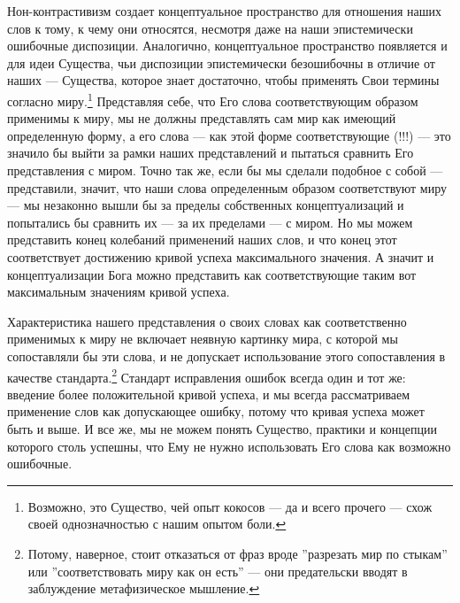 \documentclass[11pt]{book}
\begin{document}
Нон-контрастивизм создает концептуальное пространство для отношения наших слов к тому, к чему они относятся, несмотря даже на наши эпистемически ошибочные диспозиции. Аналогично, концептуальное пространство появляется и для идеи Существа, чьи диспозиции эпистемически безошибочны в отличие от наших --- Существа, которое знает достаточно, чтобы применять Свои термины согласно миру.\footnote{Возможно, это Существо, чей опыт кокосов --- да и всего прочего --- схож своей однозначностью с нашим опытом боли.} Представляя себе, что Его слова соответствующим образом применимы к миру, мы не должны представлять сам мир как имеющий определенную форму, а его слова --- как этой форме соответствующие (!!!) --- это значило бы выйти за рамки наших представлений и пытаться сравнить Его представления с миром. Точно так же, если бы мы сделали подобное с собой --- представили, значит, что наши слова определенным образом соответствуют миру --- мы незаконно вышли бы за пределы собственных концептуализаций и попытались бы сравнить их --- за их пределами --- с миром. Но мы можем представить конец колебаний применений наших слов, и что конец этот соответствует достижению кривой успеха максимального значения. А значит и концептуализации Бога можно представить как соответствующие таким вот максимальным значениям кривой успеха.

Характеристика нашего представления о своих словах как соответственно применимых к миру не включает неявную картинку мира, с которой мы сопоставляли бы эти слова, и не допускает использование этого сопоставления в качестве стандарта.\footnote{Потому, наверное, стоит отказаться от фраз вроде ''разрезать мир по стыкам'' или ''соответствовать миру как он есть'' --- они предательски вводят в заблуждение метафизическое мышление.} Стандарт исправления ошибок всегда один и тот же: введение более положительной кривой успеха, и мы всегда рассматриваем применение слов как допускающее ошибку, потому что кривая успеха может быть и выше. И все же, мы не можем понять Существо, практики и концепции которого столь успешны, что Ему не нужно использовать Его слова как возможно ошибочные.
\end{document}
